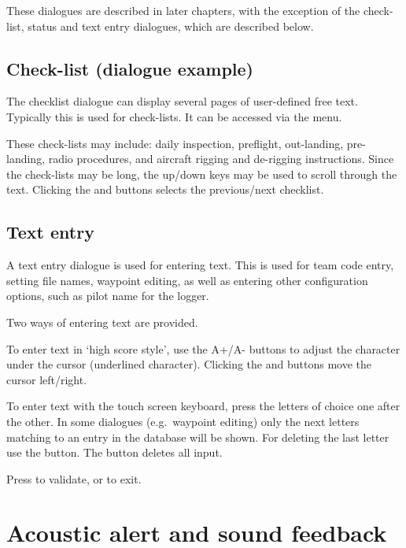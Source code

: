 These dialogues are described in later chapters, with the exception of the
check-list, status and text entry dialogues, which are described below.


\subsection*{Check-list (dialogue example)}\label{sec:checklist}

The checklist dialogue can display several pages of user-defined free text.
Typically this is used for check-lists. It can be accessed via the menu.

\blink{}

These check-lists may include: daily inspection, preflight,
out-landing, pre-landing, radio procedures, and aircraft rigging and
de-rigging instructions.  Since the check-lists may be long, the
up/down keys may be used to scroll through the text. Clicking the
\bmenuw{$<$} and \bmenuw{$>$} buttons selects the previous/next
checklist.


\subsection*{Text entry} \label{sec:textentry}

A text entry dialogue is used for entering text.  This is used for team
code entry, setting file names, waypoint editing, as well as entering
other configuration options, such as pilot name for the logger.

Two ways of entering text are provided. 

To enter text in `high score style', use the A+/A- buttons to adjust the 
character under the cursor (underlined character). Clicking the \button{$<$} 
and \button{$>$} buttons move the cursor left/right.  

To enter text with the touch screen keyboard, press the letters of choice 
one after the other. In some dialogues (e.g.\ waypoint editing) only the next
letters matching to an entry in the database will be shown. For deleting the 
last letter use the \button{$<-$} button. The  button deletes all input.

Press  to validate, or  to exit.


\section{Acoustic alert and sound feedback}


